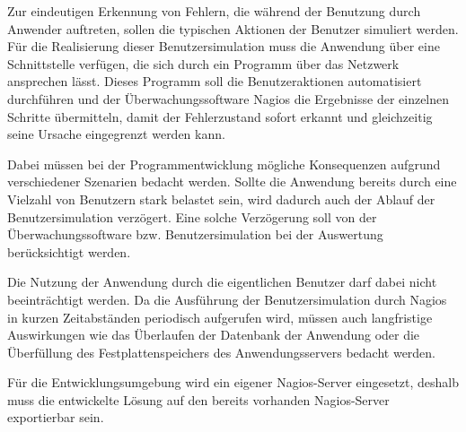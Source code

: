 Zur eindeutigen Erkennung von Fehlern, die während der Benutzung durch Anwender auftreten, sollen die typischen Aktionen der Benutzer simuliert werden. 
Für die Realisierung dieser Benutzersimulation muss die Anwendung über eine Schnittstelle verfügen, die sich durch ein Programm über das Netzwerk ansprechen lässt.
Dieses Programm soll die Benutzeraktionen automatisiert durchführen und der Überwachungssoftware Nagios die Ergebnisse der einzelnen Schritte übermitteln, damit der Fehlerzustand sofort erkannt und gleichzeitig seine Ursache eingegrenzt werden kann.

Dabei müssen bei der Programmentwicklung mögliche Konsequenzen aufgrund verschiedener Szenarien bedacht werden.
Sollte die Anwendung bereits durch eine Vielzahl von Benutzern stark belastet sein, wird dadurch auch der Ablauf der Benutzersimulation verzögert.
Eine solche Verzögerung soll von der Überwachungssoftware bzw. Benutzersimulation bei der Auswertung berücksichtigt werden.

Die Nutzung der Anwendung durch die eigentlichen Benutzer darf dabei nicht beeinträchtigt werden.
Da die Ausführung der Benutzersimulation durch Nagios in kurzen Zeitabständen periodisch aufgerufen wird, müssen auch langfristige Auswirkungen wie das Überlaufen der Datenbank der Anwendung oder die Überfüllung des Festplattenspeichers des Anwendungsservers bedacht werden.

Für die Entwicklungsumgebung wird ein eigener Nagios-Server eingesetzt, deshalb muss die entwickelte Lösung auf den bereits vorhanden Nagios-Server exportierbar sein.


